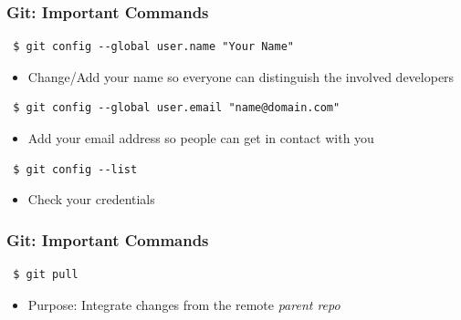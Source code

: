 \documentclass{beamer} %
\begin{document}
\begin{frame}[t, fragile]
	\frametitle{Git: Important Commands}
	
	\begin{verbatim} 
 $ git config --global user.name "Your Name"
	\end{verbatim}
	
	\begin{itemize}
		\setlength\itemsep{1em}
		\item Change/Add your name so everyone can distinguish the involved developers	
	\end{itemize}

	\begin{verbatim} 
 $ git config --global user.email "name@domain.com"
\end{verbatim}

	\begin{itemize}
	\setlength\itemsep{1em}
	\item Add your email address so people can get in contact with you
\end{itemize}

	\begin{verbatim} 
 $ git config --list
\end{verbatim}

\begin{itemize}
	\setlength\itemsep{1em}
	\item Check your credentials
\end{itemize}
\end{frame}

\begin{frame}[t, fragile]
\frametitle{Git: Important Commands}

\begin{verbatim} 
 $ git pull
\end{verbatim}

\begin{itemize}
	\item Purpose: Integrate changes from the remote \emph{parent repo}
\end{itemize}
\end{frame}
\end{document}
